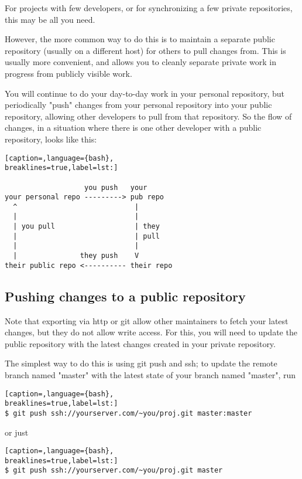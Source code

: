 For projects with few developers, or for synchronizing a few private
repositories, this may be all you need.

However, the more common way to do this is to maintain a separate public
repository (usually on a different host) for others to pull changes from. This
is usually more convenient, and allows you to cleanly separate private work in
progress from publicly visible work.

You will continue to do your day-to-day work in your personal repository, but
periodically "push" changes from your personal repository into your public
repository, allowing other developers to pull from that repository. So the flow
of changes, in a situation where there is one other developer with a public
repository, looks like this:
\lstset{basicstyle=\scriptsize, numbers=none, captionpos=b, tabsize=4}
\begin{lstlisting}[caption=,language={bash},
breaklines=true,label=lst:]

                   you push   your
your personal repo ---------> pub repo
  ^                            |
  |                            |
  | you pull                   | they
  |                            | pull
  |                            |
  |               they push    V
their public repo <---------- their repo
\end{lstlisting}

\subsection{Pushing changes to a public repository}
Note that exporting via http or git allow other maintainers to fetch your
latest changes, but they do not allow write access. For this, you will need to
update the public repository with the latest changes created in your private
repository.

The simplest way to do this is using git push and ssh; to update the remote
branch named "master" with the latest state of your branch named "master", run
\lstset{basicstyle=\scriptsize, numbers=none, captionpos=b, tabsize=4}
\begin{lstlisting}[caption=,language={bash},
breaklines=true,label=lst:]
$ git push ssh://yourserver.com/~you/proj.git master:master
\end{lstlisting}

or just
\lstset{basicstyle=\scriptsize, numbers=none, captionpos=b, tabsize=4}
\begin{lstlisting}[caption=,language={bash},
breaklines=true,label=lst:]
$ git push ssh://yourserver.com/~you/proj.git master
\end{lstlisting}


